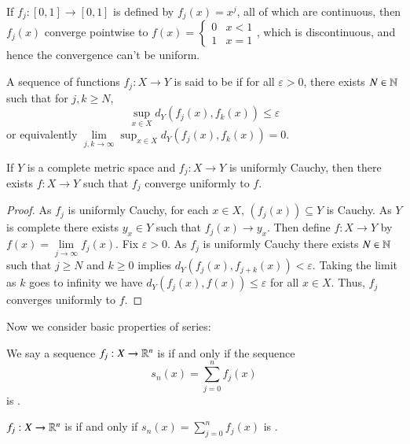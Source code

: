 \begin{example}
    If $f_j:[0,1]\rightarrow [0,1]$ is defined by $f_j(x) = x^j$, all of which are continuous, then $f_j(x)$ converge pointwise to $f(x) = \left\{\begin{array}{cc} 0 & x < 1 \\ 1 & x = 1\end{array}\right.$, which is discontinuous, and hence the convergence can't be uniform.
\end{example}

\begin{definition}
    A sequence of functions $f_j:X\rightarrow Y$ is said to be  if for all $\varepsilon > 0$, there exists $N \in \mathbb N$ such that for $j,k\geq N$, $$\sup_{x\in X}d_Y(f_j(x),f_k(x)) \leq \varepsilon$$ or equivalently $\lim\limits_{j,k\rightarrow \infty}\sup_{x\in X}d_Y(f_j(x),f_k(x))  = 0$.
\end{definition}

\begin{proposition}\label{prop:3.2.2}
    If $Y$ is a complete metric space and $f_j:X\rightarrow Y$ is uniformly Cauchy, then there exists $f:X\rightarrow Y$ such that $f_j$ converge uniformly to $f$.
\end{proposition}
\begin{proof}
    As $f_j$ is uniformly Cauchy, for each $x \in X$, $(f_j(x)) \subseteq Y$ is Cauchy. As $Y$ is complete there exists $y_x \in Y$ such that $f_j(x)\rightarrow y_x$. Then define $f:X\rightarrow Y$ by $f(x) = \lim\limits_{j\rightarrow \infty}f_j(x)$. Fix $\varepsilon > 0$. As $f_j$ is uniformly Cauchy there exists $N \in \mathbb N$ such that $j \geq N$ and $k \geq 0$ implies $d_Y(f_j(x),f_{j+k}(x)) < \varepsilon$. Taking the limit as $k$ goes to infinity we have $d_Y(f_j(x),f(x)) \leq \varepsilon$ for all $x \in X$. Thus, $f_j$ converges uniformly to $f$.
\end{proof}


Now we consider basic properties of series: 

\begin{definition}
    We say a sequence $f_j:X\rightarrow \mathbb R^n$ is  if and only if the sequence \begin{equation*}
        s_n(x) = \sum_{j=0}^{n}f_j(x)
    \end{equation*}
    is .
\end{definition}

\begin{definition}
    $f_j:X\rightarrow \mathbb R^n$ is  if and only if $s_n(x) = \sum_{j=0}^nf_j(x)$ is .
\end{definition}

